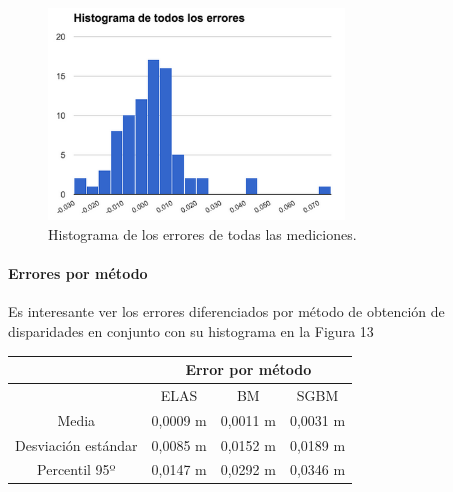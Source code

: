 \documentclass[11pt,a4paper,titlepage]{article}
\newcommand{\Figure}[1]{Figura #1}
\begin{document}
\begin{figure}[h!]

  \centering
    \includegraphics[width=0.7\textwidth]{f11.png}
  \caption{Histograma de los errores de todas las mediciones.}
\end{figure}

\paragraph{Errores por método}
\hfill \break
Es interesante ver los errores diferenciados por método de obtención de disparidades en conjunto con su histograma en la \Figure{13}

\begin{table}[!ht]
\centering
\begin{tabular}{@{}clll@{}}
& \multicolumn{3}{c}{Error por método} \\ \midrule
       & \multicolumn{1}{c}{ELAS} & \multicolumn{1}{c}{BM} & \multicolumn{1}{c}{SGBM} \\ \midrule
Media & 0,0009 m & 0,0011 m & 0,0031 m \\ \midrule
Desviación estándar & 0,0085 m & 0,0152 m & 0,0189 m \\ \midrule
Percentil 95º & 0,0147 m & 0,0292 m & 0,0346 m \\ \midrule
\end{tabular}
\end{table}
\end{document}
